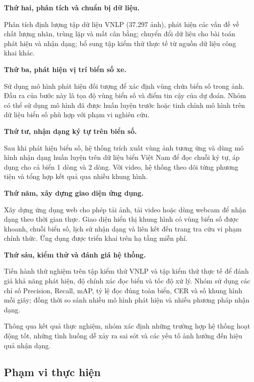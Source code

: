 \noindent\textbf{Thứ hai, phân tích và chuẩn bị dữ liệu.}
\nopagebreak

Phân tích định lượng tập dữ liệu VNLP (37.297 ảnh), phát hiện các vấn đề về chất lượng nhãn, trùng lặp và mất cân bằng; chuyển đổi dữ liệu cho bài toán phát hiện và nhận dạng; bổ sung tập kiểm thử thực tế từ nguồn dữ liệu công khai khác.

\noindent\textbf{Thứ ba, phát hiện vị trí biển số xe.}
\nopagebreak

Sử dụng mô hình phát hiện đối tượng để xác định vùng chứa biển số trong ảnh. Đầu ra của bước này là tọa độ vùng biển số và điểm tin cậy của dự đoán. Nhóm có thể sử dụng mô hình đã được huấn luyện trước hoặc tinh chỉnh mô hình trên dữ liệu biển số phù hợp với phạm vi nghiên cứu.

\noindent\textbf{Thứ tư, nhận dạng ký tự trên biển số.}
\nopagebreak

Sau khi phát hiện biển số, hệ thống trích xuất vùng ảnh tương ứng và dùng mô hình nhận dạng huấn luyện trên dữ liệu biển Việt Nam để đọc chuỗi ký tự, áp dụng cho cả biển 1 dòng và 2 dòng. Với video, hệ thống theo dõi từng phương tiện và tổng hợp kết quả qua nhiều khung hình.

\noindent\textbf{Thứ năm, xây dựng giao diện ứng dụng.}
\nopagebreak

Xây dựng ứng dụng web cho phép tải ảnh, tải video hoặc dùng webcam để nhận dạng theo thời gian thực. Giao diện hiển thị khung hình có vùng biển số được khoanh, chuỗi biển số, lịch sử nhận dạng và liên kết đến trang tra cứu vi phạm chính thức. Ứng dụng được triển khai trên hạ tầng miễn phí.

\noindent\textbf{Thứ sáu, kiểm thử và đánh giá hệ thống.}
\nopagebreak

Tiến hành thử nghiệm trên tập kiểm thử VNLP và tập kiểm thử thực tế để đánh giá khả năng phát hiện, độ chính xác đọc biển và tốc độ xử lý. Nhóm sử dụng các chỉ số Precision, Recall, mAP, tỷ lệ đọc đúng toàn biển, CER và số khung hình mỗi giây; đồng thời so sánh nhiều mô hình phát hiện và nhiều phương pháp nhận dạng.

Thông qua kết quả thực nghiệm, nhóm xác định những trường hợp hệ thống hoạt động tốt, những tình huống dễ xảy ra sai sót và các yếu tố ảnh hưởng đến hiệu quả nhận dạng.

\subsection{Phạm vi thực hiện}

